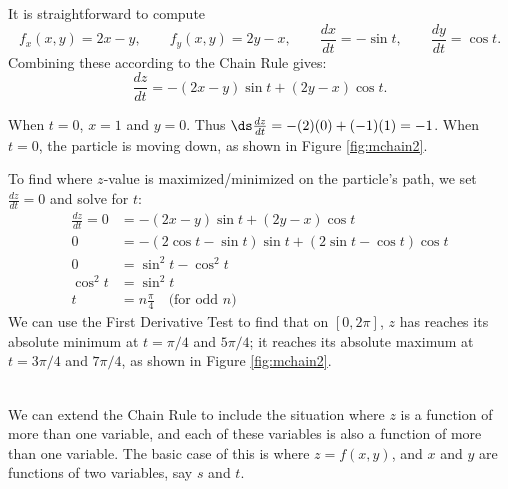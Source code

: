 {It is straightforward to compute
$$f_x(x,y) = 2x-y,\qquad f_y(x,y) = 2y-x,\qquad \frac{dx}{dt} = -\sin t,\qquad \frac{dy}{dt} = \cos t.$$
Combining these according to the Chain Rule gives:
$$\frac{dz}{dt} = -(2x-y)\sin t + (2y-x)\cos t.$$

When $t=0$, $x=1$ and $y=0$. Thus $\ds\frac{dz}{dt} = -(2)(0)+ (-1)(1) = -1$. When $t=0$, the particle is moving down, as shown in Figure \ref{fig:mchain2}. 

To find where $z$-value is maximized/minimized on the particle's path, we set $\frac{dz}{dt}=0$ and solve for $t$:
\begin{align*}
\frac{dz}{dt} =0 &= -(2x-y)\sin t + (2y-x)\cos t\\
			0&= -(2\cos t-\sin t)\sin t+(2\sin t-\cos t)\cos t\\
			0&= \sin^2t-\cos^2t\\
\cos^2t &=\sin^2t\\
	t&= n\frac{\pi}4\quad \text{(for odd $n$)}
\end{align*}
We can use the First Derivative Test to find that on $[0,2\pi]$, $z$ has reaches its absolute minimum at $t=\pi/4$ and $5\pi/4$; it reaches its absolute maximum at $t=3\pi/4$ and $7\pi/4$, as shown in Figure \ref{fig:mchain2}.
}\\


We can extend the Chain Rule to include the situation where $z$ is a function of more than one variable, and each of these variables is also a function of more than one variable. The basic case of this is where $z=f(x,y)$, and $x$ and $y$ are functions of two variables, say $s$ and $t$. \\

